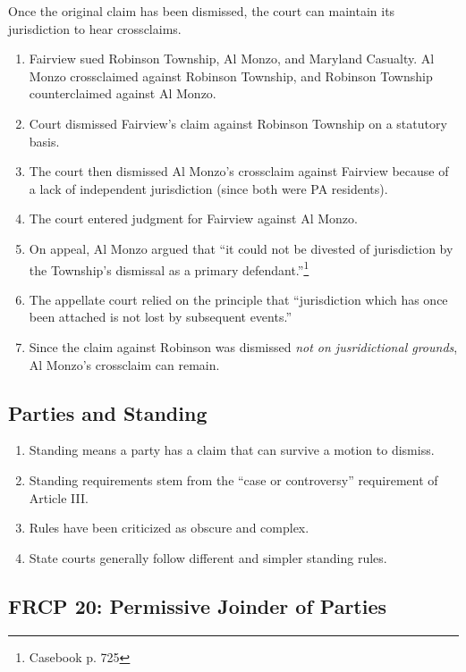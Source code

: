 Once the original claim has been dismissed, the court can maintain its 
jurisdiction to hear crossclaims.

\begin{enumerate}
    \item Fairview sued Robinson Township, Al Monzo, and Maryland Casualty. Al 
    Monzo crossclaimed against Robinson Township, and Robinson Township 
    counterclaimed against Al Monzo.
    \item Court dismissed Fairview's claim against Robinson Township on a 
    statutory basis.
    \item The court then dismissed Al Monzo's crossclaim against Fairview 
    because of a lack of independent jurisdiction (since both were PA 
    residents).
    \item The court entered judgment for Fairview against Al Monzo. 
    \item On appeal, Al Monzo argued that ``it could not be divested of 
    jurisdiction by the Township's dismissal as a primary 
    defendant.''\footnote{Casebook p.  725}
    \item The appellate court relied on the principle that ``jurisdiction 
    which has once been attached is not lost by subsequent events.''
    \item Since the claim against Robinson was dismissed \emph{not on 
    jusridictional grounds}, Al Monzo's crossclaim can remain.
\end{enumerate}

\subsection{Parties and Standing}

\begin{enumerate}
    \item Standing means a party has a claim that can survive a motion to 
    dismiss.
    \item Standing requirements stem from the ``case or controversy'' 
    requirement of Article III.
    \item Rules have been criticized as obscure and complex.
    \item State courts generally follow different and simpler standing rules.
\end{enumerate}

\subsection{FRCP 20: Permissive Joinder of Parties}

